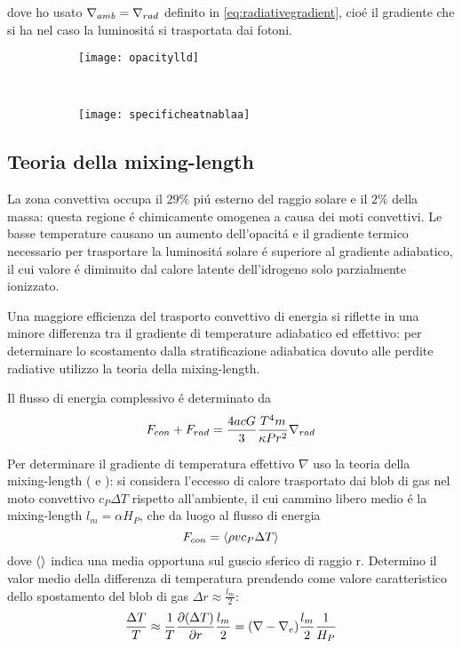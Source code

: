 \documentclass[../main.tex]{subfiles}
\begin{document}
dove ho usato $\nabla_{amb}=\nrad{}$ definito in \eqref{eq:radiativegradient}, cio\'e il gradiente che si ha nel caso la luminosit\'a si trasportata dai fotoni.

\begin{figure}[!h]
\begin{subfigure}[t]{0.5\linewidth}
\centering
\texttt{[image: opacitylld]}
\end{subfigure}
~
\begin{subfigure}[t]{0.5\linewidth}
\centering
\texttt{[image: specificheatnablaa]}
\end{subfigure}
    
\end{figure}

\subsection{Teoria della mixing-length}

La zona convettiva occupa il $29\%$ pi\'u esterno del raggio solare e il $2\%$ della massa: questa regione \'e chimicamente omogenea a causa dei moti convettivi. Le basse temperature causano un aumento dell'opacit\'a e il gradiente termico necessario per trasportare la luminosit\'a solare \'e superiore al gradiente adiabatico, il cui valore \'e diminuito dal calore latente dell'idrogeno solo parzialmente ionizzato.

Una maggiore efficienza del trasporto convettivo di energia si riflette in una minore differenza tra il gradiente di temperature adiabatico ed effettivo: per determinare lo scostamento dalla stratificazione adiabatica dovuto alle perdite radiative utilizzo la teoria della mixing-length.

Il flusso di energia complessivo \'e determinato da
\begin{equation}
F_{con}+F_{rad}=\frac{4acG}{3}\frac{T^4m}{\kappa Pr^2}\nrad{}\label{eq:totalflux}
\end{equation}

Per determinare il gradiente di temperatura effettivo $\nabla$ uso la teoria della mixing-length (\cite{prandtl25tur} e \cite{vitense53kon}):
si considera l'eccesso di calore trasportato dai blob di gas nel moto convettivo $c_P\Delta T$ rispetto all'ambiente, il cui cammino libero medio \'e la mixing-length $l_m=\alpha H_P$, che da luogo al flusso di energia
\begin{equation}
F_{con}=\exv{\rho vc_P\Delta T}\label{eq:convectiveflux}
\end{equation}
dove $\exv{}$ indica una media opportuna sul guscio sferico di raggio r. Determino il valor medio della differenza di temperatura prendendo come valore caratteristico dello spostamento del blob di gas $\Delta r\approx\frac{l_m}{2}$:
\begin{equation}
\frac{\Delta T}{T}\approx\frac{1}{T}\PDy{r}{(\Delta T)}\frac{l_m}{2}=(\nabla-\nabla_e)\frac{l_m}{2}\frac{1}{H_P}
\end{equation}
\end{document}
